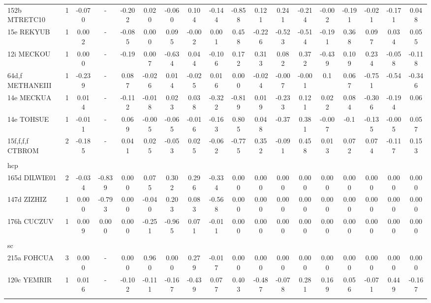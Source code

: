 \begin{table}[!ht]
\begin{tabular}{llcccccccccccccccc}
152b MTRETC10 & 1 & -0.070 & -  & -0.202 & 0.020 & -0.060 & 0.104 & -0.144 & -0.858 & 0.121 & 0.241 & -0.214 & -0.002 & -0.191 & -0.021 & -0.171 & 0.048 \\
15e REKYUB & 1 & 0.002 & - & -0.085 & 0.000 & 0.095 & -0.002 & 0.001 & 0.458 & -0.226 & -0.523 & -0.514 & -0.191 & 0.368 & 0.097 & 0.034 & 0.055 \\
12i MECKOU & 1 & 0.000 & - & -0.19 & 0.007 & -0.634 & 0.044 & -0.106 & 0.172 & 0.313 & 0.082 & 0.372 & -0.439 & 0.109 & 0.234 & -0.058 & -0.118 \\
64d,f METHANEIII & 1 & -0.239 & - & 0.087 & -0.026 & 0.014 & -0.025 & 0.016 & 0.000 & -0.024 & -0.007 & -0.001 & 0.1 & 0.067 & -0.751 & -0.54 & -0.346 \\
14e MECKUA & 1 & 0.014 & - & -0.112 & -0.018 & 0.023 & 0.038 & -0.322 & -0.819 & 0.019 & -0.233 & 0.121 & 0.022 & 0.084 & -0.306 & -0.194 & 0.06 \\
14e TOHSUE & 1 & -0.011 & - & 0.069 & -0.005 & -0.065 & -0.016 & -0.163 & 0.805 & 0.048 & -0.37 & 0.381 & -0.007 & -0.1 & -0.135 & -0.005 & 0.057 \\
15f,f,f,f CTBROM & 2 & -0.185 & - & 0.041 & 0.025 & -0.053 & 0.025 & -0.062 & -0.775 & 0.352 & -0.091 & 0.458 & 0.013 & 0.072 & 0.074 & -0.117 & 0.153 \\
\\
hcp\\
165d DILWIE01 & 2 & -0.034 & -0.839 & 0.000  & 0.075 & 0.302 & 0.296 & -0.334 & 0.000  & 0.000  & 0.000  & 0.000  & 0.000  & 0.000  & 0.000  & 0.000 & 0.000 \\
147d ZIZHIZ & 1 & 0.000 & -0.793 & 0.000 & -0.040 & 0.203 & 0.083 & -0.568 & 0.000 & 0.000 & 0.000 & 0.000 & 0.000 & 0.000 & 0.000 & 0.000 & 0.000 \\
176h CUCZUV & 1 & 0.009 & 0.000 & 0.000  & -0.251 & -0.965 & 0.071 & -0.011 & 0.000  & 0.000  & 0.000  & 0.000  & 0.000  & 0.000  & 0.000  & 0.000  & 0.000  \\
\\
sc\\
215a FOHCUA & 3 & 0.000 & - & 0.000 & 0.960 & 0.000 & 0.279 & -0.017 & 0.000 & 0.000 & 0.000 & 0.000 & 0.000 & 0.000 & 0.000 & 0.000 & 0.000 \\
120c YEMRIR & 1 & 0.016 & - & -0.102 & -0.111 & -0.167 & -0.439 & 0.077 & 0.403 & -0.487 & -0.078 & 0.281 & 0.169 & 0.056 & -0.071 & 0.449 & -0.167\\
\hline\\
\end{tabular}
\end{table}